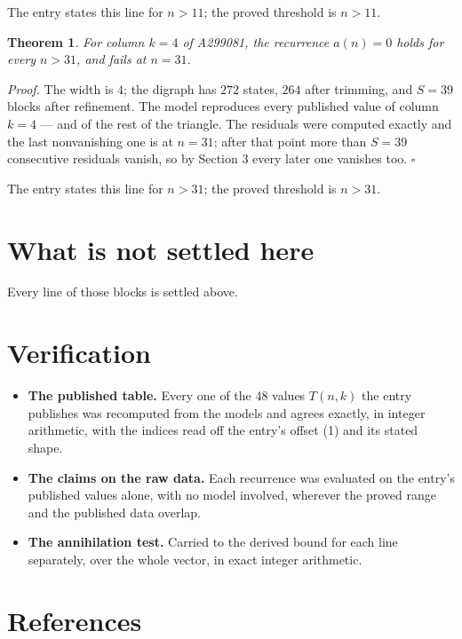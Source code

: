 \documentclass[11pt]{article}
\newtheorem{theorem}{Theorem}
\theoremstyle{definition}
\begin{document}
The entry states this line for $n > 11$; the proved threshold is $n > 11$.

\begin{theorem} For column $k = 4$ of A299081, the recurrence $a(n) = 0$ holds for every $n > 31$, and fails at $n = 31$.\end{theorem}

{\itshape Proof.} The width is $4$; the digraph has $272$ states, $264$ after trimming, and $S = 39$ blocks after refinement. The model reproduces every published value of column $k = 4$ --- and of the rest of the triangle. The residuals were computed exactly and the last nonvanishing one is at $n = 31$; after that point more than $S = 39$ consecutive residuals vanish, so by Section 3 every later one vanishes too. $\square$

The entry states this line for $n > 31$; the proved threshold is $n > 31$.

\section{What is not settled here}

Every line of those blocks is settled above.

\section{Verification}

\begin{itemize}

\item {\bfseries The published table.} Every one of the 48 values $T(n,k)$ the entry publishes was recomputed from the models and agrees exactly, in integer arithmetic, with the indices read off the entry's offset (1) and its stated shape.

\item {\bfseries The claims on the raw data.} Each recurrence was evaluated on the entry's published values alone, with no model involved, wherever the proved range and the published data overlap.

\item {\bfseries The annihilation test.} Carried to the derived bound for each line separately, over the whole vector, in exact integer arithmetic.

\end{itemize}

\section{References}
\end{document}
